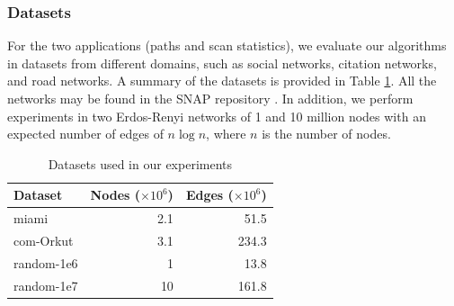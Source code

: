 \subsubsection{Datasets}
For the two applications (paths and scan statistics), we evaluate our algorithms in datasets from different domains, such as social networks, citation networks, and road networks. A summary of the datasets is provided in Table \ref{table:datasets}. All the networks may be found in the SNAP repository \cite{snapnets}. In addition, we perform experiments in two Erdos-Renyi networks of 1 and 10 million nodes with an expected number of edges of $n\log n$, where $n$ is the number of nodes.

\begin{table}[ht]
\centering \caption{\small Datasets used in our experiments}
\vspace{-.1in}
\label{table:datasets}
\begin{tabular}{|l|r|r|}
\hline
\textbf{Dataset}  & \textbf{Nodes ($\times 10^6$)} & \textbf{Edges ($\times 10^6$)} \\
\hline
miami & 2.1 & 51.5\\
\hline
com-Orkut  & 3.1 & 234.3\\
\hline
random-1e6 & 1 & 13.8\\
\hline
random-1e7 & 10 & 161.8\\
\hline
\end{tabular}
\end{table}

